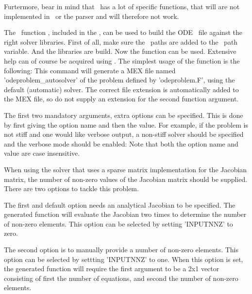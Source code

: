 Furtermore, bear in mind that \MATLAB~has a lot of specific functions, that will are not implemented in \Fortran~or the parser and will therefore not work.

The \MATLAB~function , included in the \PPODESUITE, can be used to build the ODE \Fortran~file against the right solver libraries. First of all, make sure the \PPODESUITE~paths are added to the \MATLAB~path variable.
And the libraries are build.
Now the function  can be used. Extensive help can of course be acquired using . The simplest usage of the function is the following:
This command will generate a MEX file named 'odeproblem\_autosolver' of the problem defined by 'odeproblem.F', using the default (automatic) solver. The correct file extension is automatically added to the MEX file, so do not supply an extension for the second function argument.

The first two mandatory arguments, extra options can be specified. This is done by first giving the option name and then the value. For example, if the problem is not stiff and one would like verbose output, a non-stiff solver should be specified and the verbose mode should be enabled:
Note that both the option name and value are case insensitive.

When using the solver that uses a sparse matrix implementation for the Jacobian matrix, the number of non-zero values of the Jacobian matrix should be supplied. There are two options to tackle this problem.

The first and default option needs an analytical Jacobian to be specified. The generated function will evaluate the Jacobian two times to determine the number of non-zero elements. This option can be selected by setting 'INPUTNNZ' to zero.

The second option is to manually provide a number of non-zero elements. This option can be selected by settting 'INPUTNNZ' to one. When this option is set, the generated function will require the first argument to be a 2x1 vector consisting of first the number of equations, and second the number of non-zero elements.


